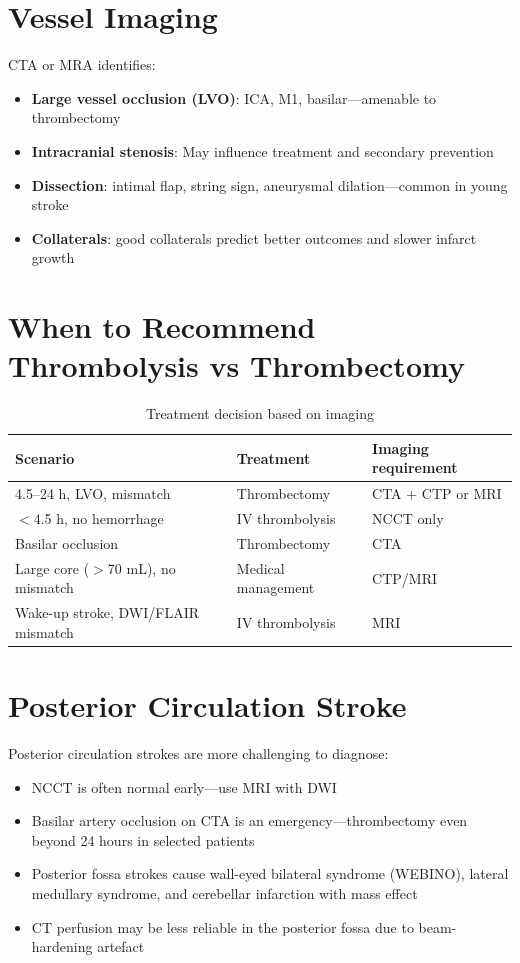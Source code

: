 \section{Vessel Imaging}
CTA or MRA identifies:
\begin{itemize}
  \item \textbf{Large vessel occlusion (LVO)}: ICA, M1, basilar---amenable to thrombectomy
  \item \textbf{Intracranial stenosis}: May influence treatment and secondary prevention
  \item \textbf{Dissection}: intimal flap, string sign, aneurysmal dilation---common in young stroke
  \item \textbf{Collaterals}: good collaterals predict better outcomes and slower infarct growth
\end{itemize}

\section{When to Recommend Thrombolysis vs Thrombectomy}

\begin{table}[h]
\centering
\caption{Treatment decision based on imaging}
\begin{tabular}{|l|l|l|}
\hline
\textbf{Scenario} & \textbf{Treatment} & \textbf{Imaging requirement} \\
\hline
4.5--24 h, LVO, mismatch & Thrombectomy & CTA + CTP or MRI \\
$<$4.5 h, no hemorrhage & IV thrombolysis & NCCT only \\
Basilar occlusion & Thrombectomy & CTA \\
Large core ($>$70 mL), no mismatch & Medical management & CTP/MRI \\
Wake-up stroke, DWI/FLAIR mismatch & IV thrombolysis & MRI \\
\hline
\end{tabular}
\end{table}

\section{Posterior Circulation Stroke}
Posterior circulation strokes are more challenging to diagnose:
\begin{itemize}
  \item NCCT is often normal early---use MRI with DWI
  \item Basilar artery occlusion on CTA is an emergency---thrombectomy even beyond 24 hours in selected patients
  \item Posterior fossa strokes cause wall-eyed bilateral syndrome (WEBINO), lateral medullary syndrome, and cerebellar infarction with mass effect
  \item CT perfusion may be less reliable in the posterior fossa due to beam-hardening artefact
\end{itemize}

